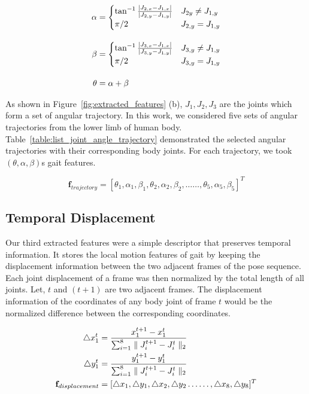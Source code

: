 \begin{equation}
	\begin{split}
	\alpha &= 
	\begin{cases}
	\tan^{-1}{\frac{|J_{2,x}-J_{1,x}|}{|J_{2,y}-J_{1,y}|}} & J_{2y} \neq J_{1,y}\\
	\pi/2 & J_{2,y} = J_{1,y}
	\end{cases} \\ \noalign{\vskip10pt}
	\beta &= 
	\begin{cases}
	\tan^{-1}{\frac{|J_{3,x}-J_{1,x}|}{|J_{3,y}-J_{1,y}|}} & J_{3,y} \neq J_{1,y}\\
	\pi/2 & J_{3,y} = J_{1,y}
	\end{cases} \\ \noalign{\vskip10pt}
	\theta &= \alpha + \beta
	\end{split}
\end{equation}

As shown in Figure~\ref{fig:extracted_features} (b), $J_1, J_2, J_3$ are the joints which form a set of angular trajectory. In this work, we considered five sets of angular trajectories from the lower limb of human body. Table~\ref{table:list_joint_angle_trajectory} demonstrated the selected angular trajectories with their corresponding body joints. For each trajectory, we took $(\theta, \alpha, \beta)$s gait features. 

\begin{equation}
\textbf {f}_{trajectory}= [\theta_1, \alpha_1, \beta_1,\theta_2, \alpha_2, \beta_2,\ldots\ldots, \theta_5, \alpha_5, \beta_5]^T
\end{equation}


\subsection{Temporal Displacement}
Our third extracted features were a simple descriptor that preserves temporal information. It stores the local motion features of gait by keeping the displacement information between the two adjacent frames of the pose sequence. Each joint displacement of a frame was then normalized by the total length of all joints. Let, $ t $ and $ (t + 1) $ are two adjacent frames. The displacement information of the coordinates of any body joint of frame $ t $ would be the normalized difference between the corresponding coordinates. 

\begin{equation}
\begin{split}
\triangle x^{t}_{1} &=\frac{x^{t+1}_{1} - x^{t}_{1}}{\sum_{i=1}^{8}\parallel J^{t+1}_{i} - J^{t}_{i}\parallel_2} \\ 
\triangle y^{t}_{1} &=\frac{y^{t+1}_{1} - y^{t}_{1}}{\sum_{i=1}^{8}\parallel J^{t+1}_{i} - J^{t}_{i}\parallel_2} \\ 
{\bf f}_{displacement} &= [\triangle x_{1}, \triangle y_{1}, \triangle x_{2}, \triangle y_{2} \ldots\ldots, \triangle x_{8}, \triangle y_{8}]^{T}
\end{split}
\end{equation}

